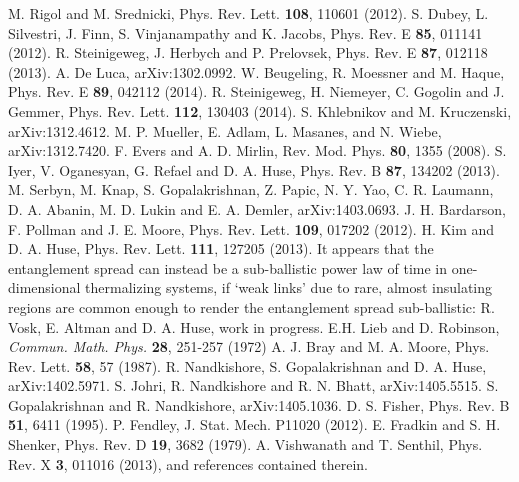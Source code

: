 \documentclass[amsmath,onecolumn, superscriptaddress,preprint,aps]{revtex4}
\begin{document}
\begin{thebibliography}{99}
M. Rigol and M. Srednicki, Phys. Rev. Lett. {\bf 108}, 110601 (2012).
S. Dubey, L. Silvestri, J. Finn, S. Vinjanampathy and K. Jacobs, Phys. Rev. E {\bf 85}, 011141 (2012).
R. Steinigeweg, J. Herbych and P. Prelovsek, Phys. Rev. E {\bf 87}, 012118 (2013).
A. De Luca, arXiv:1302.0992.
W. Beugeling, R. Moessner and M. Haque, Phys. Rev. E {\bf 89}, 042112 (2014).
R. Steinigeweg, H. Niemeyer, C. Gogolin and J. Gemmer, Phys. Rev. Lett. {\bf 112}, 130403 (2014).
S. Khlebnikov and M. Kruczenski, arXiv:1312.4612.
M. P. Mueller, E. Adlam, L. Masanes, and N. Wiebe, arXiv:1312.7420.
F. Evers and A. D. Mirlin, Rev. Mod. Phys. {\bf 80}, 1355 (2008).
S. Iyer, V. Oganesyan, G. Refael and D. A. Huse, Phys. Rev. B {\bf 87}, 134202 (2013).
M. Serbyn, M. Knap, S. Gopalakrishnan, Z. Papic, N. Y. Yao, C. R. Laumann, D. A. Abanin, M. D. Lukin and E. A. Demler, arXiv:1403.0693.
J. H. Bardarson, F. Pollman and J. E. Moore, Phys. Rev. Lett. {\bf 109}, 017202 (2012).
H. Kim and D. A. Huse, Phys. Rev. Lett. {\bf 111}, 127205 (2013).
It appears that the entanglement spread can instead be a sub-ballistic power law of time in one-dimensional thermalizing systems, if `weak links' due to rare, almost insulating regions are common enough to render the entanglement spread sub-ballistic: R. Vosk, E. Altman and D. A. Huse, work in progress.
E.H. Lieb and D. Robinson, {\it Commun. Math. Phys.} {\bf 28}, 251-257 (1972)
A. J. Bray and M. A. Moore, Phys. Rev. Lett. {\bf 58}, 57 (1987).
R. Nandkishore, S. Gopalakrishnan and D. A. Huse, arXiv:1402.5971.
S. Johri, R. Nandkishore and R. N. Bhatt, arXiv:1405.5515.
S. Gopalakrishnan and R. Nandkishore, arXiv:1405.1036.
D. S. Fisher, Phys. Rev. B {\bf 51}, 6411 (1995).
P. Fendley, J. Stat. Mech. P11020 (2012).
E. Fradkin and S. H. Shenker, Phys. Rev. D {\bf 19}, 3682 (1979).
A. Vishwanath and T. Senthil, Phys. Rev. X {\bf 3}, 011016 (2013), and references contained therein.

\end{thebibliography}
\end{document}
